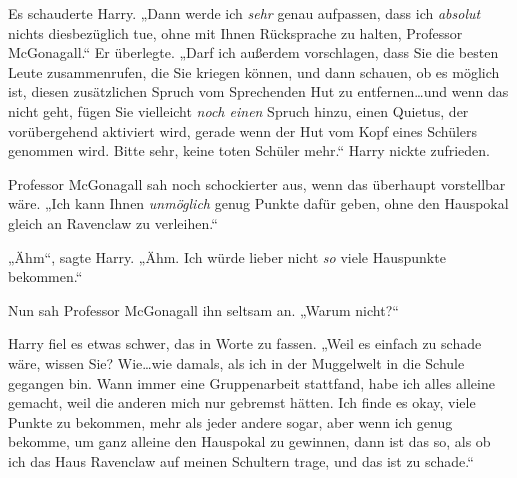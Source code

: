 Es schauderte Harry. „Dann werde ich \emph{sehr} genau aufpassen, dass ich \emph{absolut} nichts diesbezüglich tue, ohne mit Ihnen Rücksprache zu halten, Professor McGonagall.“ Er überlegte. „Darf ich außerdem vorschlagen, dass Sie die besten Leute zusammenrufen, die Sie kriegen können, und dann schauen, ob es möglich ist, diesen zusätzlichen Spruch vom Sprechenden Hut zu entfernen…und wenn das nicht geht, fügen Sie vielleicht \emph{noch einen} Spruch hinzu, einen Quietus, der vorübergehend aktiviert wird, gerade wenn der Hut vom Kopf eines Schülers genommen wird. Bitte sehr, keine toten Schüler mehr.“ Harry nickte zufrieden.

Professor McGonagall sah noch schockierter aus, wenn das überhaupt vorstellbar wäre. „Ich kann Ihnen \emph{unmöglich} genug Punkte dafür geben, ohne den Hauspokal gleich an Ravenclaw zu verleihen.“


„Ähm“, sagte Harry. „Ähm. Ich würde lieber nicht \emph{so} viele Hauspunkte bekommen.“

Nun sah Professor McGonagall ihn seltsam an. „Warum nicht?“

Harry fiel es etwas schwer, das in Worte zu fassen. „Weil es einfach zu schade wäre, wissen Sie? Wie…wie damals, als ich in der Muggelwelt in die Schule gegangen bin. Wann immer eine Gruppenarbeit stattfand, habe ich alles alleine gemacht, weil die anderen mich nur gebremst hätten. Ich finde es okay, viele Punkte zu bekommen, mehr als jeder andere sogar, aber wenn ich genug bekomme, um ganz alleine den Hauspokal zu gewinnen, dann ist das so, als ob ich das Haus Ravenclaw auf meinen Schultern trage, und das ist zu schade.“

